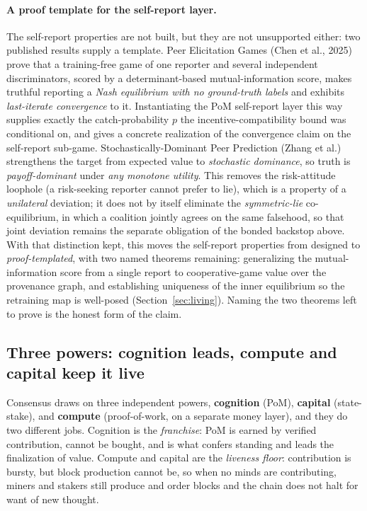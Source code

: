 \documentclass[10pt]{article}
\begin{document}
\paragraph{A proof template for the self-report layer.} The self-report properties are not built, but
they are not unsupported either: two published results supply a template. Peer Elicitation Games
(Chen et al., 2025) prove that a training-free game of one reporter and several independent
discriminators, scored by a determinant-based mutual-information score, makes truthful reporting a
\emph{Nash equilibrium with no ground-truth labels} and exhibits \emph{last-iterate convergence} to
it. Instantiating the PoM self-report layer this way supplies exactly the catch-probability $p$ the
incentive-compatibility bound was conditional on, and gives a concrete realization of the convergence
claim on the self-report sub-game. Stochastically-Dominant Peer Prediction (Zhang et al.) strengthens
the target from expected value to \emph{stochastic dominance}, so truth is \emph{payoff-dominant} under
\emph{any monotone utility}. This removes the risk-attitude loophole (a risk-seeking reporter cannot
prefer to lie), which is a property of a \emph{unilateral} deviation; it does not by itself eliminate
the \emph{symmetric-lie} co-equilibrium, in which a coalition jointly agrees on the same falsehood, so
that joint deviation remains the separate obligation of the bonded backstop above. With that
distinction kept, this moves the self-report properties from designed to \emph{proof-templated}, with
two named theorems remaining: generalizing the mutual-information score from a single report to
cooperative-game value over the provenance graph, and establishing uniqueness of the inner equilibrium
so the retraining map is well-posed (Section~\ref{sec:living}). Naming the two theorems left to prove
is the honest form of the claim.

\subsection{Three powers: cognition leads, compute and capital keep it live}

Consensus draws on three independent powers, \textbf{cognition} (PoM), \textbf{capital} (state-stake),
and \textbf{compute} (proof-of-work, on a separate money layer), and they do two different jobs.
Cognition is the \emph{franchise}: PoM is earned by verified contribution, cannot be bought, and is what
confers standing and leads the finalization of value. Compute and capital are the \emph{liveness floor}:
contribution is bursty, but block production cannot be, so when no minds are contributing, miners and
stakers still produce and order blocks and the chain does not halt for want of new thought.
\end{document}
